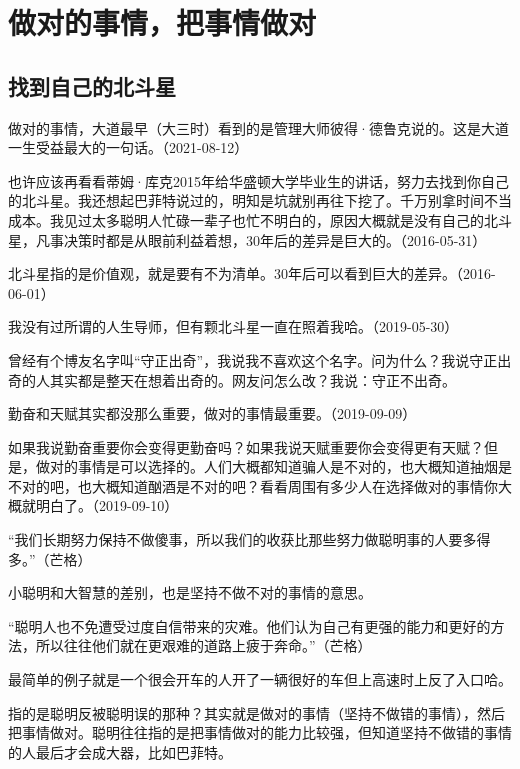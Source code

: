 
\section{做对的事情，把事情做对}


\subsection{找到自己的北斗星}

做对的事情，大道最早（大三时）看到的是管理大师彼得·德鲁克说的。这是大道一生受益最大的一句话。（2021-08-12）

也许应该再看看蒂姆·库克2015年给华盛顿大学毕业生的讲话，努力去找到你自己的北斗星。我还想起巴菲特说过的，明知是坑就别再往下挖了。千万别拿时间不当成本。我见过太多聪明人忙碌一辈子也忙不明白的，原因大概就是没有自己的北斗星，凡事决策时都是从眼前利益着想，30年后的差异是巨大的。（2016-05-31）

北斗星指的是价值观，就是要有不为清单。30年后可以看到巨大的差异。（2016-06-01）

我没有过所谓的人生导师，但有颗北斗星一直在照着我哈。（2019-05-30）

曾经有个博友名字叫“守正出奇”，我说我不喜欢这个名字。问为什么？我说守正出奇的人其实都是整天在想着出奇的。网友问怎么改？我说：守正不出奇。

勤奋和天赋其实都没那么重要，做对的事情最重要。（2019-09-09）


如果我说勤奋重要你会变得更勤奋吗？如果我说天赋重要你会变得更有天赋？但是，做对的事情是可以选择的。人们大概都知道骗人是不对的，也大概知道抽烟是不对的吧，也大概知道酗酒是不对的吧？看看周围有多少人在选择做对的事情你大概就明白了。（2019-09-10）

“我们长期努力保持不做傻事，所以我们的收获比那些努力做聪明事的人要多得多。”（芒格）

小聪明和大智慧的差别，也是坚持不做不对的事情的意思。

“聪明人也不免遭受过度自信带来的灾难。他们认为自己有更强的能力和更好的方法，所以往往他们就在更艰难的道路上疲于奔命。”（芒格）

最简单的例子就是一个很会开车的人开了一辆很好的车但上高速时上反了入口哈。

指的是聪明反被聪明误的那种？其实就是做对的事情（坚持不做错的事情），然后把事情做对。聪明往往指的是把事情做对的能力比较强，但知道坚持不做错的事情的人最后才会成大器，比如巴菲特。

